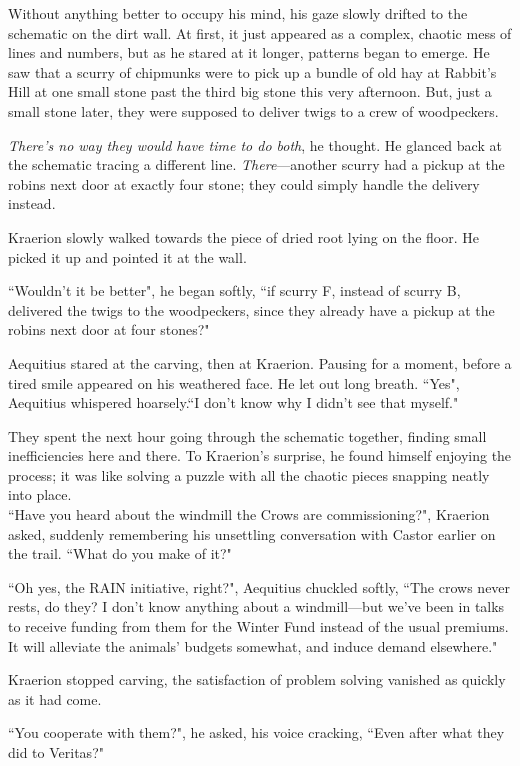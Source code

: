 Without anything better to occupy his mind, his gaze slowly drifted to the schematic on the dirt wall. At first, it just appeared as a complex, chaotic mess of lines and numbers, but as he stared at it longer, patterns began to emerge. He saw that a scurry of chipmunks were to pick up a bundle of old hay at Rabbit's Hill at one small stone past the third big stone this very afternoon. But, just a small stone later, they were supposed to deliver twigs to a crew of woodpeckers.

\textit{There's no way they would have time to do both}, he thought. He glanced back at the schematic tracing a different line. \textit{There}---another scurry had a pickup at the robins next door at exactly four stone; they could simply handle the delivery instead.

Kraerion slowly walked towards the piece of dried root lying on the floor. He picked it up and pointed it at the wall.

``Wouldn't it be better", he began softly, ``if scurry F, instead of scurry B, delivered the twigs to the woodpeckers, since they already have a pickup at the robins next door at four stones?"

Aequitius stared at the carving, then at Kraerion. Pausing for a moment, before a tired smile appeared on his weathered face. He let out long breath. ``Yes", Aequitius whispered hoarsely.``I don't know why I didn't see that myself."

They spent the next hour going through the schematic together, finding small inefficiencies here and there. To Kraerion's surprise, he found himself enjoying the process; it was like solving a puzzle with all the chaotic pieces snapping neatly into place.\\

``Have you heard about the windmill the Crows are commissioning?", Kraerion asked, suddenly remembering his unsettling conversation with Castor earlier on the trail. ``What do you make of it?"

``Oh yes, the RAIN initiative, right?", Aequitius chuckled softly, ``The crows never rests, do they? I don't know anything about a windmill---but we've been in talks to receive funding from them for the Winter Fund instead of the usual premiums. It will alleviate the animals' budgets somewhat, and induce demand elsewhere."

Kraerion stopped carving, the satisfaction of problem solving vanished as quickly as it had come.

``You cooperate with them?", he asked, his voice cracking, ``Even after what they did to Veritas?"


